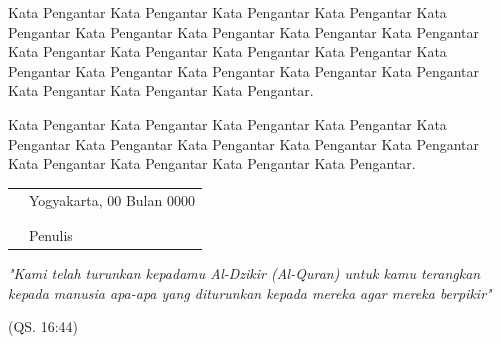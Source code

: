 \documentclass{uinsaintekskripsi}
\begin{document}
\cover\titlepage

\pengesahanscan
\persetujuanscan
\declarepagescan

\preface
Kata Pengantar Kata Pengantar Kata Pengantar Kata Pengantar Kata Pengantar Kata Pengantar Kata Pengantar Kata Pengantar Kata Pengantar Kata Pengantar Kata Pengantar Kata Pengantar Kata Pengantar Kata Pengantar Kata Pengantar Kata Pengantar Kata Pengantar Kata Pengantar Kata Pengantar Kata Pengantar Kata Pengantar.

Kata Pengantar Kata Pengantar Kata Pengantar Kata Pengantar Kata Pengantar Kata Pengantar Kata Pengantar Kata Pengantar Kata Pengantar Kata Pengantar Kata Pengantar Kata Pengantar Kata Pengantar.
\vspace{0.8cm}

\begin{tabular}{p{7cm}l}
&Yogyakarta, 00 Bulan 0000\\
&\\
&\\
&Penulis
\end{tabular}

\acknowledment
\begin{flushright}
\Large\emph{}
\end{flushright}


\motto
\emph{"Kami telah turunkan kepadamu Al-Dzikir (Al-Quran)
untuk kamu terangkan kepada manusia apa-apa  yang diturunkan kepada
mereka agar mereka berpikir"}
\begin{flushright}
(QS. 16:44)
\end{flushright}
\end{document}
